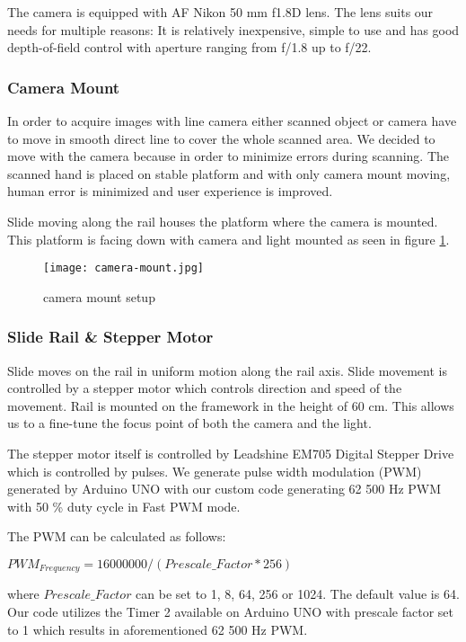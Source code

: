 The camera is equipped with AF Nikon 50 mm f1.8D lens. The lens suits our needs for multiple reasons:
It is relatively inexpensive, simple to use and has good depth-of-field control with aperture ranging from f/1.8 up to f/22.

\subsubsection*{Camera Mount}
In order to acquire images with line camera either scanned object or camera have to move in smooth direct line to cover the whole scanned area.
We decided to move with the camera because in order to minimize errors during scanning. The scanned hand is placed on stable platform and with only camera mount moving,
human error is minimized and user experience is improved.

Slide moving along the rail houses the platform where the camera is mounted. This platform is facing down with camera and light mounted as seen in figure \ref{fig:camera-mount}.

\begin{figure}[ht]
    \label{fig:camera-mount}
    \centering
    \texttt{[image: camera-mount.jpg]}
    \caption{camera mount setup}
\end{figure}


\subsubsection*{Slide Rail \& Stepper Motor}
Slide moves on the rail in uniform motion along the rail axis. Slide movement is controlled by a stepper motor which controls direction and speed of the movement.
Rail is mounted on the framework in the height of 60 cm. This allows us to a fine-tune the focus point of both the camera and the light.

The stepper motor itself is controlled by Leadshine EM705 Digital Stepper Drive which is controlled by pulses. We generate pulse width modulation (PWM) generated by Arduino UNO with our custom code generating 62 500 Hz PWM with 50 \% duty cycle in Fast PWM mode.

The PWM can be calculated as follows:

${PWM}_{Frequency} = 16000000 / (Prescale\_Factor * 256)$

where $Prescale\_Factor$ can be set to 1, 8, 64, 256 or 1024. The default value is 64. Our code utilizes the Timer 2 available on Arduino UNO with prescale factor set to 1 which results in aforementioned 62 500 Hz PWM.

